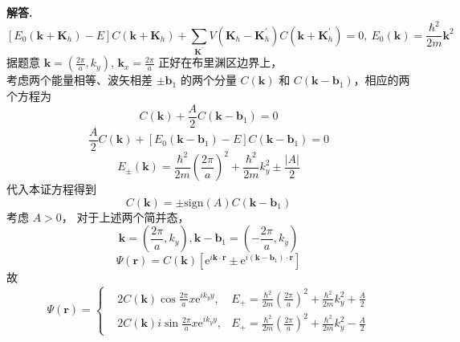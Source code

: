 \documentclass[11pt]{ctexart}
\newenvironment{solution}{\par\noindent\textbf{解答. }}{\par}
\begin{document}
\begin{solution}
\begin{equation*}
        \left[E_0(\mathbf{k} + \mathbf{K}_h) - E\right]C(\mathbf{k} + \mathbf{K}_h) + \sum_{\mathbf{K}^{\prime}}V(\mathbf{K}_h - \mathbf{K}_h^{\prime})C(\mathbf{k} + \mathbf{K}_h^{\prime}) = 0,\ E_0(\mathbf{k}) = \frac{\hbar^2}{2m}\mathbf{k}^2
    \end{equation*}
    据题意 $\displaystyle\mathbf{k} = \left(\frac{2\pi}{a}, k_y\right)$, $\displaystyle\mathbf{k}_x = \frac{2\pi}{a}$ 正好在布里渊区边界上， \\[12pt]
    考虑两个能量相等、波矢相差 $\pm\mathbf{b}_1$ 的两个分量 $C(\mathbf{k})$ 和 $C(\mathbf{k} - \mathbf{b}_1)$，相应的两个方程为
    \begin{equation*}
        [E_0(\mathbf{k}) - E]C(\mathbf{k}) + \frac{A}{2}C(\mathbf{k} - \mathbf{b}_1) = 0
    \end{equation*}
    \begin{equation*}
        \frac{A}{2}C(\mathbf{k}) + [E_0(\mathbf{k} - \mathbf{b}_1) - E]C(\mathbf{k} - \mathbf{b}_1) = 0
    \end{equation*}
    \begin{equation*}
        E_\pm(\mathbf{k}) = \frac{\hbar^2}{2m}\left(\frac{2\pi}{a}\right)^2 + \frac{\hbar^2}{2m}k_y^2 \pm \frac{\left|A\right|}{2}
    \end{equation*}
    代入本证方程得到
    \begin{equation*}
        C(\mathbf{k}) = \pm \text{sign}(A)C(\mathbf{k} - \mathbf{b}_1)
    \end{equation*}
    考虑 $A > 0$， 对于上述两个简并态，
    \begin{equation*}
        \mathbf{k} = \left(\frac{2\pi}{a}, k_y\right), \mathbf{k} - \mathbf{b}_1 = \left(-\frac{2\pi}{a}, k_y\right)
    \end{equation*}
    \begin{equation*}
        \Psi(\mathbf{r}) = C(\mathbf{k})[\text{e}^{i\mathbf{k}\cdot\mathbf{r}}\pm\text{e}^{i(\mathbf{k} - \mathbf{b}_1)\cdot\mathbf{r}}]
    \end{equation*}
    故
    \begin{equation*}
        \Psi(\mathbf{r}) = 
            \left\{
                \begin{aligned}
                & 2C(\mathbf{k})\cos{\frac{2\pi}{a}x}\text{e}^{ik_y y}, & E_+ = \frac{\hbar^2}{2m}\left(\frac{2\pi}{a}\right)^2 + \frac{\hbar^2}{2m}k_y^2 + \frac{A}{2} \\[12pt]
                & 2C(\mathbf{k})i\sin{\frac{2\pi}{a}x}\text{e}^{ik_y y}, & E_+ = \frac{\hbar^2}{2m}\left(\frac{2\pi}{a}\right)^2 + \frac{\hbar^2}{2m}k_y^2 - \frac{A}{2} 

\end{aligned}
\end{equation*}
\end{solution}
\end{document}

